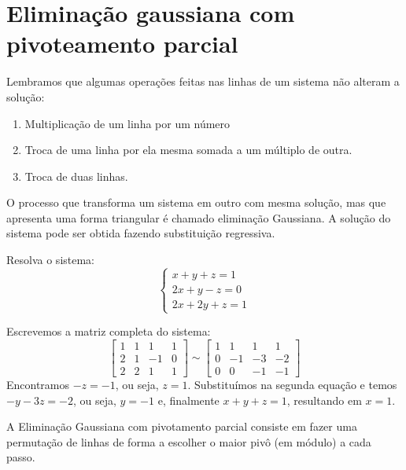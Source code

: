 \section{Eliminação gaussiana com pivoteamento parcial}
Lembramos que algumas operações feitas nas linhas de um sistema não alteram a solução:
\begin{enumerate}
\item Multiplicação de um linha por um número
\item Troca de uma linha por ela mesma somada a um múltiplo de outra.
\item Troca de duas linhas.
\end{enumerate}

O processo que transforma um sistema em outro com mesma solução, mas que apresenta uma forma triangular é chamado eliminação Gaussiana. A solução do sistema pode ser obtida fazendo substituição regressiva.
\begin{ex} Resolva o sistema:
  \begin{equation*}
    \left\{\begin{array}{c}
        x+y+z=1\\
        2x+y-z=0\\
        2x+2y+z=1
      \end{array}\right.  
  \end{equation*}
\end{ex}
\begin{sol}
Escrevemos a matriz completa do sistema:
\begin{equation*}
  \left[\begin{array}{ccc|c}
      1 &1& 1&1\\
      2 &1& -1&0\\
      2 & 2 &1&1
    \end{array}\right] \sim 
  \left[\begin{array}{ccc|c}
      1 &1& 1&1\\
      0 &-1& -3&-2\\
      0 & 0 &-1&-1
    \end{array}\right]
\end{equation*}
Encontramos $-z=-1$, ou seja, $z=1$. Substituímos na segunda equação e temos $-y-3z=-2$, ou seja, $y=-1$ e, finalmente $x+y+z=1$, resultando em $x=1$.
\end{sol}

A Eliminação Gaussiana com pivotamento parcial consiste em fazer uma permutação de linhas de forma a escolher o maior pivô (em módulo) a cada passo.

